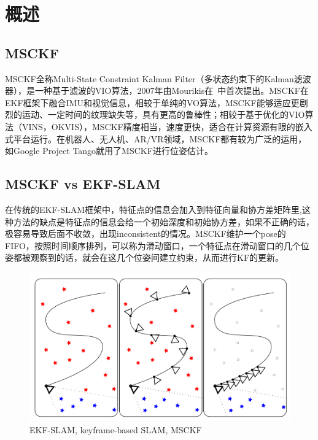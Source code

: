 \documentclass[12pt,a4paper]{article}
\begin{document}
\maketitle
\tableofcontents

\noindent
\setlength{\parindent}{2em}
\setlength{\parskip}{0.3em}
\linespread{1}

\newpage
\section{概述}

\subsection{MSCKF}

MSCKF全称Multi-State Constraint Kalman Filter（多状态约束下的Kalman滤波器），是一种基于滤波的VIO算法，2007年由Mourikis在~\cite{mourikis2007multi}中首次提出。MSCKF在EKF框架下融合IMU和视觉信息，相较于单纯的VO算法，MSCKF能够适应更剧烈的运动、一定时间的纹理缺失等，具有更高的鲁棒性；相较于基于优化的VIO算法（VINS，OKVIS），MSCKF精度相当，速度更快，适合在计算资源有限的嵌入式平台运行。在机器人、无人机、AR/VR领域，MSCKF都有较为广泛的运用，如Google Project Tango就用了MSCKF进行位姿估计。

\subsection{MSCKF vs EKF-SLAM}

在传统的EKF-SLAM框架中，特征点的信息会加入到特征向量和协方差矩阵里,这种方法的缺点是特征点的信息会给一个初始深度和初始协方差，如果不正确的话，极容易导致后面不收敛，出现inconsistent的情况。MSCKF维护一个pose的FIFO，按照时间顺序排列，可以称为滑动窗口，一个特征点在滑动窗口的几个位姿都被观察到的话，就会在这几个位姿间建立约束，从而进行KF的更新。~\cite{xinliang-zhong-msckf_notes}

\begin{figure}[!htbp]
\centering
\includegraphics[scale=0.25]{images/ekf-slam-vs-msckf.png}
\caption{EKF-SLAM, keyframe-based SLAM, MSCKF}
\end{figure}
\end{document}
